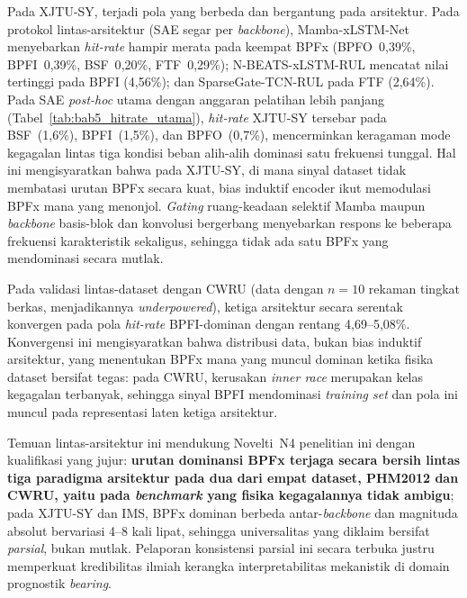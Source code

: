 Pada XJTU-SY, terjadi pola yang berbeda {\color{blue}dan bergantung
pada arsitektur}. {\color{blue}Pada protokol lintas-arsitektur (SAE
segar per \emph{backbone}), Mamba-xLSTM-Net menyebarkan \emph{hit-rate}
hampir merata pada keempat BPFx (BPFO~0{,}39\%, BPFI~0{,}39\%, BSF~0{,}20\%,
FTF~0{,}29\%); N-BEATS-xLSTM-RUL mencatat nilai tertinggi pada BPFI
(4{,}56\%); dan SparseGate-TCN-RUL pada FTF (2{,}64\%).}
{\color{blue}Pada SAE \emph{post-hoc} utama dengan anggaran pelatihan lebih
panjang (Tabel~\ref{tab:bab5_hitrate_utama}), \emph{hit-rate} XJTU-SY tersebar
pada BSF~(1{,}6\%), BPFI~(1{,}5\%), dan BPFO~(0{,}7\%), mencerminkan keragaman
mode kegagalan lintas tiga kondisi beban alih-alih dominasi satu frekuensi
tunggal.}
Hal ini mengisyaratkan bahwa pada XJTU-SY, di mana sinyal dataset tidak
membatasi urutan BPFx secara kuat, {\color{blue}bias induktif} encoder ikut
memodulasi BPFx mana yang menonjol. \emph{Gating} ruang-keadaan selektif
Mamba maupun \emph{backbone} basis-blok dan konvolusi bergerbang
menyebarkan respons ke beberapa frekuensi karakteristik sekaligus, sehingga
tidak ada satu BPFx yang mendominasi secara mutlak.

Pada validasi lintas-dataset dengan CWRU (data dengan $n = 10$ rekaman
{\color{blue}tingkat berkas}, menjadikannya \emph{underpowered}),
ketiga arsitektur secara serentak
konvergen pada pola \emph{hit-rate} BPFI-dominan dengan rentang 4{,}69--5{,}08\%.
Konvergensi ini mengisyaratkan bahwa distribusi data, bukan {\color{blue}bias induktif}
arsitektur, yang menentukan BPFx mana yang muncul dominan {\color{blue}ketika
fisika dataset bersifat tegas}: pada CWRU, kerusakan \emph{inner race}
merupakan kelas kegagalan terbanyak, sehingga sinyal BPFI mendominasi
\emph{training set} dan pola ini muncul pada representasi laten ketiga
arsitektur.

{\color{blue}Temuan lintas-arsitektur ini mendukung Novelti~N4
penelitian ini dengan kualifikasi yang jujur:}
\textbf{{\color{blue}urutan dominansi BPFx terjaga secara bersih
lintas tiga paradigma arsitektur pada dua dari empat dataset, PHM2012
dan CWRU, yaitu pada \emph{benchmark} yang fisika kegagalannya tidak
ambigu}}{\color{blue}; pada XJTU-SY dan IMS, BPFx dominan berbeda
antar-\emph{backbone} dan magnituda absolut bervariasi 4--8 kali lipat,
sehingga universalitas yang diklaim bersifat \emph{parsial}, bukan mutlak.}
{\color{blue}Pelaporan konsistensi parsial ini secara terbuka justru memperkuat kredibilitas ilmiah
kerangka interpretabilitas mekanistik di domain prognostik \emph{bearing}.}

